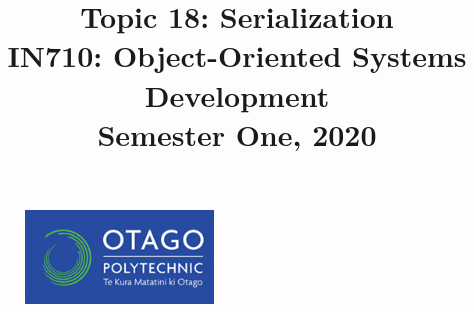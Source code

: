 \documentclass{article}
\author{}
\begin{document}
\begin{figure}
  \includegraphics[width=50mm]{../../resources/img/logo.png}
\end{figure}

\title{Topic 18: Serialization\\IN710: Object-Oriented Systems Development\\Semester One, 2020}
\date{}
\maketitle
\end{document}
